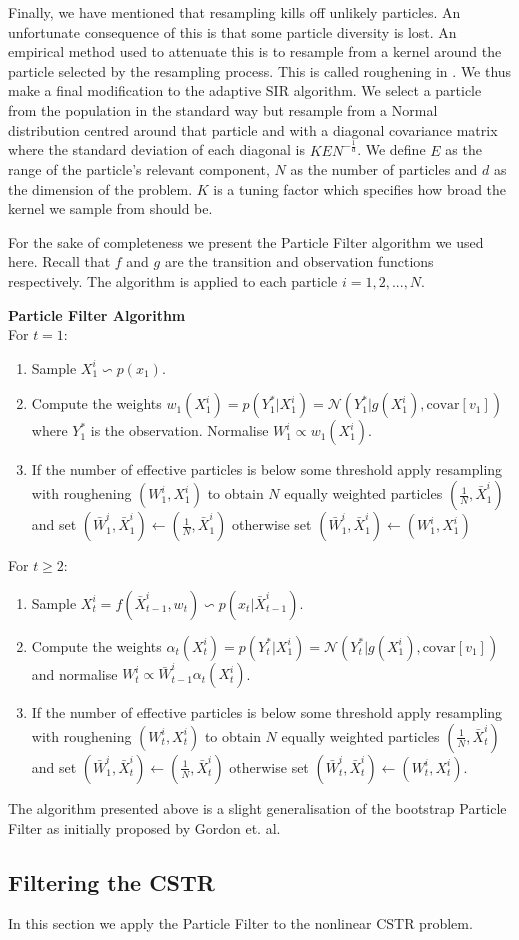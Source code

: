 \documentclass[../masters.tex]{subfiles}
\begin{document}
Finally, we have mentioned that resampling kills off unlikely particles. An unfortunate consequence of this is that some particle diversity is lost. An empirical method used to attenuate this is to resample from a kernel around the particle selected by the resampling process. This is called roughening in \cite{gordon}. We thus make a final modification to the adaptive SIR algorithm. We select a particle from the population in the standard way but resample from a Normal distribution centred around that particle and with a diagonal covariance matrix where the standard deviation of each diagonal is $KEN^{-\frac{1}{d}}$. We define $E$ as the range of the particle's relevant component, $N$ as the number of particles and $d$ as the dimension of the problem. $K$ is a tuning factor which specifies how broad the kernel we sample from should be. 

For the sake of completeness we present the Particle Filter algorithm we used here. Recall that $f$ and $g$ are the transition and observation functions respectively. The algorithm is applied to each particle $i=1,2,...,N$.

\textbf{Particle Filter Algorithm}\\
For $t=1$:
\begin{enumerate}
\item
Sample $X^i_1 \backsim p(x_1)$.
\item
Compute the weights $w_1(X_1^i) = p(Y^*_1|X_1^i) = \mathcal{N}(Y^*_1|g(X^i_1), \text{covar}[v_1])$ where $Y^*_1$ is the observation. Normalise $W^i_1 \propto w_1(X^i_1)$.
\item
If the number of effective particles is below some threshold apply resampling with roughening $(W^i_1, X^i_1)$ to obtain $N$ equally weighted particles $(\frac{1}{N}, \bar{X}^i_1)$ and set $(\bar{W}^i_1, \bar{X}^i_1) \leftarrow (\frac{1}{N}, \bar{X}^i_1)$ otherwise set $(\bar{W}^i_1, \bar{X}^i_1) \leftarrow ({W}^i_1, {X}^i_1)$
\end{enumerate}
For $t \geq 2$:
\begin{enumerate}
\item
Sample $X^i_t = f(\bar{X}^i_{t-1}, w_t) \backsim p(x_t|\bar{X}^i_{t-1})$.
\item
Compute the weights $\alpha_t(X^i_{t}) = p(Y^*_t|X_1^i) = \mathcal{N}(Y^*_t|g(X^i_1), \text{covar}[v_1])$ and normalise $W^i_t \propto \bar{W}^i_{t-1}\alpha_t(X^i_{t})$.
\item
If the number of effective particles is below some threshold apply resampling with roughening $(W^i_t, X^i_{t})$ to obtain $N$ equally weighted particles $(\frac{1}{N}, \bar{X}^i_{t})$ and set $(\bar{W}^i_1, \bar{X}^i_t) \leftarrow (\frac{1}{N}, \bar{X}^i_t)$ otherwise set $(\bar{W}^i_t, \bar{X}^i_t) \leftarrow ({W}^i_t, {X}^i_t)$.
\end{enumerate}
The algorithm presented above is a slight generalisation of the bootstrap Particle Filter as initially proposed by Gordon et. al.

\subsection{Filtering the CSTR}
In this section we apply the Particle Filter to the nonlinear CSTR problem.

%
%
\end{document}
